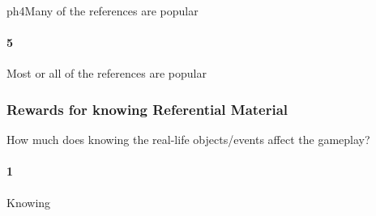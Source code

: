 ph{4}Many of the references are popular\paragraph{5}Most or all of the references are popular\subsubsection{Rewards for knowing Referential Material}How much does knowing the real-life objects/events affect the gameplay?\paragraph{1}Knowing